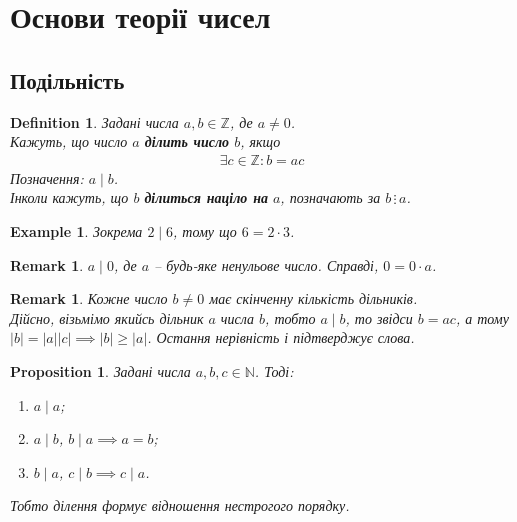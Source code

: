 \documentclass[a4paper, 14pt]{extarticle}
\theoremstyle{theoremdd}
\theoremstyle{theoremdd}
\newtheorem{definition}[theorem]{Definition}
\theoremstyle{theoremdd}
\theoremstyle{theoremdd}
\newtheorem{example}[theorem]{Example}
\theoremstyle{theoremdd}
\newtheorem{proposition}[theorem]{Proposition}
\theoremstyle{theoremdd}
\newtheorem{remark}[theorem]{Remark}
\theoremstyle{theoremdd}
\theoremstyle{theoremdd}
\begin{document}

\tableofcontents
\newpage

\iffalse
\section*{Теорія чисел?}
Ну в принципі, да, але ні. Після класичної теорії чисел підуть більш комплексні теми, описуючи узагальнення теорії чисел. Спочатку пройду курс за Michael Penn з канала MathMajor, одночасно читаючи книгу Burton для повного розуміння, а далі вже узагальнення. Можливо, буду й там й там писати нові теми.
\bigskip \\
Авторські виправлення: додати Well-ordering principle, бо деякі теореми цього вимагають.
\newpage
\fi

\section{Основи теорії чисел}
\subsection{Подільність}
\begin{definition}
Задані числа $a,b \in \mathbb{Z}$, де $a \neq 0$.\\
Кажуть, що число $a$ \textbf{ділить число} $b$, якщо
\begin{align*}
\exists c \in \mathbb{Z}: b = ac
\end{align*}
Позначення: $a \mid b$.\\
Інколи кажуть, що $b$ \textbf{ділиться націло на} $a$,  позначають за $b \, \vdots \, a$.
\end{definition}

\begin{example}
Зокрема $2 \mid 6$, тому що $6 = 2 \cdot 3$.
\end{example}

\begin{remark}
$a \mid 0$, де $a$ -- будь-яке ненульове число. Справді, $0 = 0 \cdot a$.
\end{remark}

\begin{remark}
Кожне число $b \neq 0$ має скінченну кількість дільників.\\
Дійсно, візьмімо якийсь дільник $a$ числа $b$, тобто $a \mid b$, то звідси $b = ac$, а тому $|b| = |a||c| \implies |b| \geq |a|$. Остання нерівність і підтверджує слова.
\end{remark}

\begin{proposition}
Задані числа $a,b,c \in \mathbb{N}$. Тоді:
\begin{enumerate}[nosep,wide=0pt,label={\arabic*)}]
\item $a \mid a$;
\item $a \mid b$, $b \mid a \implies a = b$;
\item $b \mid a$, $c \mid b \implies c \mid a$.   
\end{enumerate}
Тобто ділення формує відношення нестрогого порядку.
\end{proposition}
\end{document}
